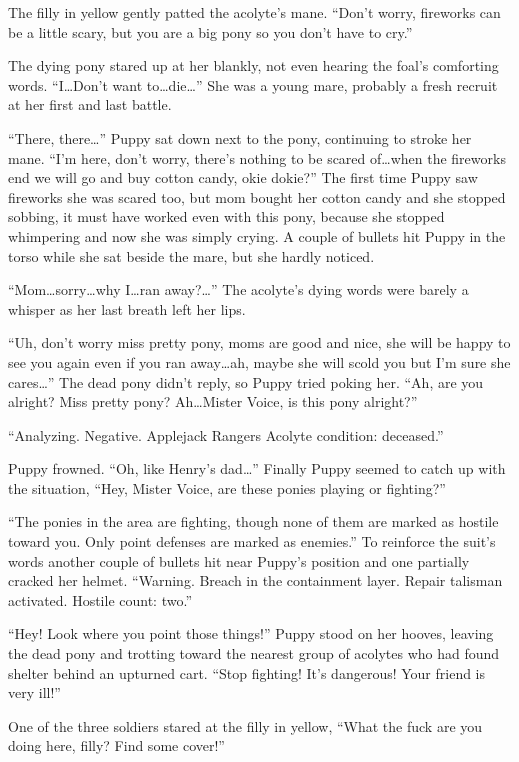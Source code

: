 The filly in yellow gently patted the acolyte's mane. ``Don't worry, fireworks can be a little scary, but you are a big pony so you don't have to cry.''

The dying pony stared up at her blankly, not even hearing the foal's comforting words. ``I\dots Don't want to\dots die\dots'' She was a young mare, probably a fresh recruit at her first and last battle.

``There, there\dots'' Puppy sat down next to the pony, continuing to stroke her mane. ``I'm here, don't worry, there's nothing to be scared of\dots when the fireworks end we will go and buy cotton candy, okie dokie?'' The first time Puppy saw fireworks she was scared too, but mom bought her cotton candy and she stopped sobbing, it must have worked even with this pony, because she stopped whimpering and now she was simply crying. A couple of bullets hit Puppy in the torso while she sat beside the mare, but she hardly noticed.

``Mom\dots sorry\dots why I\dots ran away?\dots'' The acolyte's dying words were barely a whisper as her last breath left her lips.

``Uh, don't worry miss pretty pony, moms are good and nice, she will be happy to see you again even if you ran away\dots ah, maybe she will scold you but I'm sure she cares\dots'' The dead pony didn't reply, so Puppy tried poking her. ``Ah, are you alright? Miss pretty pony? Ah\dots Mister Voice, is this pony alright?''

``{\mt Analyzing. Negative. Applejack Rangers Acolyte condition: deceased.}''

Puppy frowned. ``Oh, like Henry's dad\dots'' Finally Puppy seemed to catch up with the situation, ``Hey, Mister Voice, are these ponies playing or fighting?''

``{\mt The ponies in the area are fighting, though none of them are marked as hostile toward you. Only point defenses are marked as enemies.}'' To reinforce the suit's words another couple of bullets hit near Puppy's position and one partially cracked her helmet. ``{\mt Warning. Breach in the containment layer. Repair talisman activated. Hostile count: two.}''

``Hey! Look where you point those things!'' Puppy stood on her hooves, leaving the dead pony and trotting toward the nearest group of acolytes who had found shelter behind an upturned cart. ``Stop fighting! It's dangerous! Your friend is very ill!''

One of the three soldiers stared at the filly in yellow, ``What the fuck are you doing here, filly? Find some cover!''

